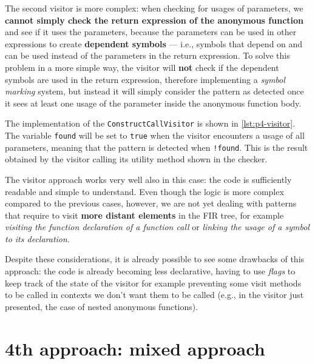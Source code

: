 \documentclass[12pt,a4paper,openright,twoside]{book}
\begin{document}


The second visitor is more complex: when checking for usages of parameters, we
\textbf{cannot simply check the return expression of the anonymous function} and
see if it uses the parameters, because the parameters can be used in other
expressions to create \textbf{dependent symbols} --- i.e., symbols that depend
on and can be used instead of the parameters in the return expression.
%
To solve this problem in a more simple way, the visitor will \textbf{not} check
if the dependent symbols are used in the return expression, therefore
implementing a \emph{symbol marking} system, but instead it will simply consider
the pattern as detected once it sees at least one usage of the parameter inside
the anonymous function body.  

The implementation of the \lstinline{ConstructCallVisitor} is shown in
\cref{lst:p4-visitor}. The variable \lstinline{found} will be set to
\lstinline{true} when the visitor encounters a usage of all parameters, meaning
that the pattern is detected when \lstinline{!found}. This is the result
obtained by the visitor calling its utility method shown in the checker. 



The visitor approach works very well also in this case: the code is sufficiently
readable and simple to understand. Even though the logic is more complex
compared to the previous cases, however, we are not yet dealing with patterns
that require to visit \textbf{more distant elements} in the \ac{FIR} tree, for
example \emph{visiting the function declaration of a function call} or
\emph{linking the usage of a symbol to its declaration}. 

Despite these considerations, it is already possible to see some drawbacks of
this approach: the code is already becoming less declarative, having to use
\emph{flags} to keep track of the state of the visitor for example preventing
some visit methods to be called in contexts we don't want them to be called
(e.g., in the visitor just presented, the case of nested anonymous functions). 

\section{4th approach: mixed approach}
\end{document}
